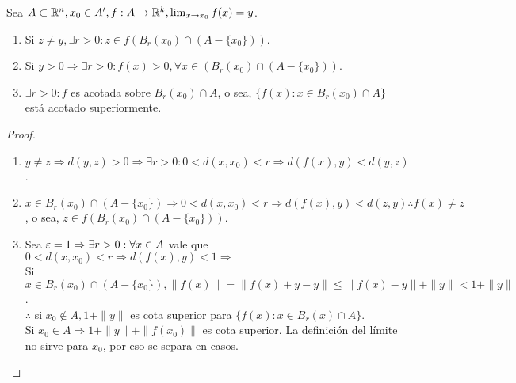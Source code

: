 \begin{prop}
  Sea \(A \subset \mathbb{R}^n, x_0 \in A^{\prime}, f: A \to \mathbb{R}^k, \lim_{x \to x_0} f(x) = y\).
  \begin{enumerate}
    \item Si \(z \neq y, \exists r > 0 : z \in f(B_r(x_0) \cap (A -\{x_0\}))\).
    \item Si \(y > 0 \Rightarrow \exists r > 0 : f(x) > 0, \forall x \in (B_r(x_0) \cap (A -
            \{x_0\}))\).
    \item \(\exists r > 0 : f\) es acotada sobre \(B_r(x_0) \cap A\), o sea, \( \{f(x) : x \in B_r(x_0) \cap A\} \) está acotado superiormente.
  \end{enumerate}

  \begin{proof}
    \begin{enumerate}
      \item \(y \neq z \Rightarrow d(y, z) > 0 \Rightarrow \exists r > 0 : 0 < d(x, x_0) < r \Rightarrow d(f(x), y) < d(y, z)\).
      \item \(x \in B_r(x_0) \cap (A - \{x_0\}) \Rightarrow 0 < d(x, x_0) < r \Rightarrow d(f(x), y) < d(z, y) \therefore f(x) \neq z\), o sea, \(z \in f(B_r(x_0) \cap (A - \{x_0\}))\).
      \item Sea \(\varepsilon = 1 \Rightarrow \exists r > 0 : \forall x \in A\) vale que \(0 < d(x,
              x_0) < r \Rightarrow d(f(x), y) < 1 \Rightarrow \) \\ Si \(x \in B_r(x_0) \cap (A
              - \{x_0\}), \|f(x)\| = \|f(x) + y - y\| \leq \|f(x) - y\| + \|y\| < 1 + \|y\| \).
            \\ \(\therefore \) si \(x_0 \notin A, 1+\|y\| \) es cota superior para \( \{f(x) : x
              \in B_r(x) \cap A\} \). \\ Si \(x_0 \in A \Rightarrow 1 + \|y\| + \|f(x_0)\| \) es
            cota superior. La definición del límite no sirve para \(x_0\), por eso se separa
            en casos.
    \end{enumerate}
  \end{proof}
\end{prop}

